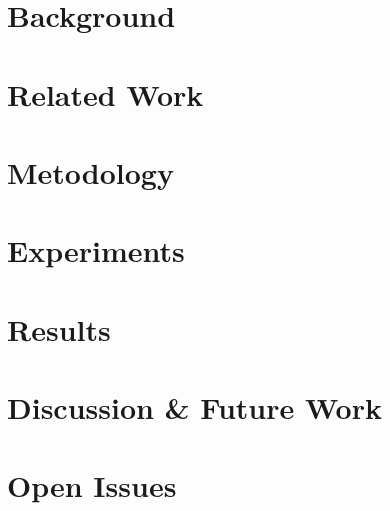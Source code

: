 \documentclass{article}
\begin{document}
% 

\section{Background}


\section{Related Work}


\section{Metodology}


\section{Experiments}


\section{Results}


\section{Discussion \& Future Work}

% 

\section*{Open Issues}


\printbibliography
\end{document}
